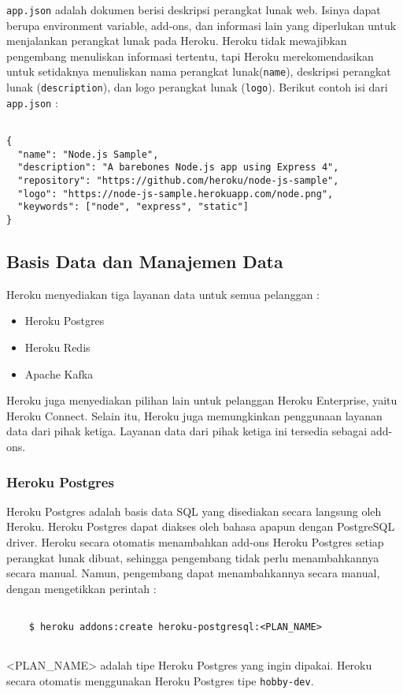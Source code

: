 \texttt{app.json} adalah dokumen berisi deskripsi perangkat lunak web. Isinya dapat berupa environment variable, add-ons, dan informasi lain yang diperlukan untuk menjalankan perangkat lunak pada Heroku. Heroku tidak mewajibkan pengembang menuliskan informasi tertentu, tapi Heroku merekomendasikan untuk setidaknya menuliskan nama perangkat lunak(\texttt{name}), deskripsi perangkat lunak (\texttt{description}), dan logo perangkat lunak (\texttt{logo}). Berikut contoh isi dari \texttt{app.json} :
\begin{lstlisting}

{
  "name": "Node.js Sample",
  "description": "A barebones Node.js app using Express 4",
  "repository": "https://github.com/heroku/node-js-sample",
  "logo": "https://node-js-sample.herokuapp.com/node.png",
  "keywords": ["node", "express", "static"]
}

\end{lstlisting}

\subsection{Basis Data dan Manajemen Data}
Heroku menyediakan tiga layanan data untuk semua pelanggan :
\begin{itemize}
\item Heroku Postgres
\item Heroku Redis
\item Apache Kafka
\end{itemize}
Heroku juga menyediakan pilihan lain untuk pelanggan Heroku Enterprise, yaitu Heroku Connect. Selain itu, Heroku juga memungkinkan penggunaan layanan data dari pihak ketiga. Layanan data dari pihak ketiga ini tersedia sebagai add-ons.

\subsubsection{Heroku Postgres}
Heroku Postgres adalah basis data SQL yang disediakan secara langsung oleh Heroku. Heroku Postgres dapat diakses oleh bahasa apapun dengan PostgreSQL driver. Heroku secara otomatis menambahkan add-ons Heroku Postgres setiap perangkat lunak dibuat, sehingga pengembang tidak perlu menambahkannya secara manual. Namun, pengembang dapat menambahkannya secara manual, dengan mengetikkan perintah :
\begin{lstlisting}
	
	$ heroku addons:create heroku-postgresql:<PLAN_NAME>
	
\end{lstlisting}
<PLAN\_NAME> adalah tipe Heroku Postgres yang ingin dipakai. Heroku secara otomatis menggunakan Heroku Postgres tipe \texttt{hobby-dev}.

